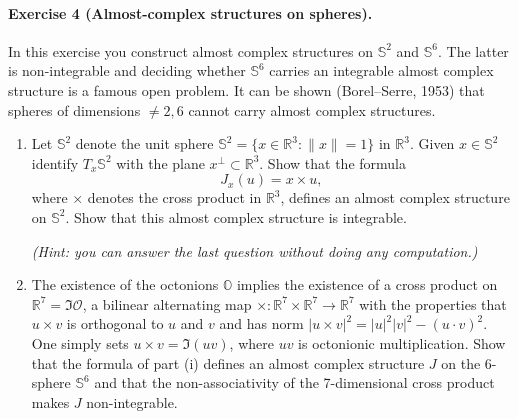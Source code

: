 \documentclass{article}
\theoremstyle{definition}
\renewcommand{\O}{\mathcal{O}}
\renewcommand{\S}{\mathbb{S}}
\newcommand{\bbO}{\mathbb{O}}
\newcommand{\R}{\mathbb{R}}
\begin{document}
\paragraph{Exercise 4 {\normalfont(Almost-complex structures on spheres)}.} In
this exercise you construct almost complex structures on $\S^2$ and $\S^6$. The
latter is non-integrable and deciding whether $\S^6$ carries an integrable
almost complex structure is a famous open problem. It can be shown
(Borel--Serre, 1953) that spheres of dimensions $\ne2,6$ cannot carry almost
complex structures.
\begin{enumerate}[label=(\roman*)]
    \item Let $\S^2$ denote the unit sphere $\S^2=\{x\in\R^3:\|x\|=1\}$ in
        $\R^3$. Given $x\in\S^2$ identify $T_x\S^2$ with the plane
        $x^\perp\subset\R^3$. Show that the formula
        \begin{equation*}
            J_x(u) = x\times u,
        \end{equation*}
        where $\times$ denotes the cross product in $\R^3$, defines an almost
        complex structure on $\S^2$. Show that this almost complex structure is
        integrable.

        \textit{(Hint: you can answer the last question without doing any
        computation.)}

    \item The existence of the octonions $\bbO$ implies the existence of a cross
        product on $\R^7=\Im\O$, a bilinear alternating map
        $\times:\R^7\times\R^7\to\R^7$ with the properties that $u\times v$ is
        orthogonal to $u$ and $v$ and has norm
        $|u\times v|^2=|u|^2|v|^2-(u\cdot v)^2$. One simply sets
        $u\times v=\Im(uv)$, where $uv$ is octonionic multiplication. Show that
        the formula of part (i) defines an almost complex structure $J$ on the
        6-sphere $\S^6$ and that the non-associativity of the 7-dimensional
        cross product makes $J$ non-integrable.
\end{enumerate}
\end{document}
